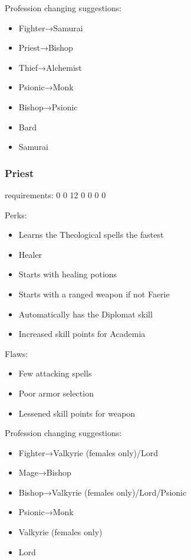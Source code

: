 \documentclass[12pt]{article}
\newcommand{\WviiTwoColumnSetup}{\raggedcolumns\RaggedRight}
\begin{document}
Profession changing suggestions:

\begin{itemize}
\item
  Fighter→Samurai
\item
  Priest→Bishop
\item
  Thief→Alchemist
\item
  Psionic→Monk
\item
  Bishop→Psionic
\item
  Bard
\item
  Samurai
\end{itemize}

\subsubsection{Priest}\label{priest}

requirements: 0 0 12 0 0 0 0

\begin{multicols}{2}\WviiTwoColumnSetup
Perks:

\begin{itemize}
\item
  Learns the Theological spells the fastest
\item
  Healer
\item
  Starts with healing potions
\item
  Starts with a ranged weapon if not Faerie
\item
  Automatically has the Diplomat skill
\item
  Increased skill points for Academia
\end{itemize}
\columnbreak

Flaws:

\begin{itemize}
\item
  Few attacking spells
\item
  Poor armor selection
\item
  Lessened skill points for weapon
\end{itemize}
\end{multicols}

Profession changing suggestions:

\begin{itemize}
\item
  Fighter→Valkyrie (females only)\fshyp{}Lord
\item
  Mage→Bishop
\item
  Bishop→Valkyrie (females only)\fshyp{}Lord\fshyp{}Psionic
\item
  Psionic→Monk
\item
  Valkyrie (females only)
\item
  Lord
\end{itemize}
\end{document}
